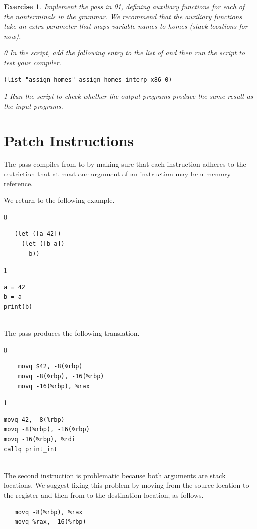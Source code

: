 \documentclass[7x10]{TimesAPriori_MIT}%
\def\racketEd{0}
\def\pythonEd{1}
\def\edition{1}
\newcommand{\racket}[1]{{\if\edition\racketEd{#1}\fi}}
\newcommand{\pythonColor}[0]{}
\newcommand{\python}[1]{{\if\edition\pythonEd\pythonColor #1\fi}}
\newtheorem{exercise}[theorem]{Exercise}
\numberwithin{theorem}{chapter}
\numberwithin{definition}{chapter}
\numberwithin{equation}{chapter}
\begin{document}

\begin{exercise}\normalfont\normalsize
Implement the  pass in
\racket{}\python{}, defining
auxiliary functions for each of the nonterminals in the \LangXVar{}
grammar.  We recommend that the auxiliary functions take an extra
parameter that maps variable names to homes (stack locations for now).
%
{\if\edition\racketEd
In the  script, add the following entry to the
list of  and then run the script to test your compiler.
\begin{lstlisting}
(list "assign homes" assign-homes interp_x86-0)
\end{lstlisting}
\fi}
{\if\edition\pythonEd\pythonColor
Run the  script to check
whether the output programs produce the same result as the input
programs.
\fi}
\end{exercise}


\section{Patch Instructions}
\label{sec:patch-s0}

The  pass compiles from \LangXVar{} to
\LangXInt{} by making sure that each instruction adheres to the
restriction that at most one argument of an instruction may be a
memory reference. 

We return to the following example.\\
\begin{minipage}{0.5\textwidth}
{\if\edition\racketEd
\begin{lstlisting}
   (let ([a 42])
     (let ([b a])
       b))
\end{lstlisting}
\fi}
{\if\edition\pythonEd\pythonColor
\begin{lstlisting}
a = 42
b = a
print(b)
\end{lstlisting}
\fi}
\end{minipage}\\
The  pass produces the following translation. \\
\begin{minipage}{0.5\textwidth}
{\if\edition\racketEd
\begin{lstlisting}
    movq $42, -8(%rbp)
    movq -8(%rbp), -16(%rbp)
    movq -16(%rbp), %rax
\end{lstlisting}
\fi}
{\if\edition\pythonEd\pythonColor
\begin{lstlisting}
movq 42, -8(%rbp)
movq -8(%rbp), -16(%rbp)
movq -16(%rbp), %rdi
callq print_int
\end{lstlisting}
\fi}
\end{minipage}\\
The second  instruction is problematic because both
arguments are stack locations. We suggest fixing this problem by
moving from the source location to the register  and then
from  to the destination location, as follows.
\begin{lstlisting}
   movq -8(%rbp), %rax
   movq %rax, -16(%rbp)
\end{lstlisting}
\end{document}
